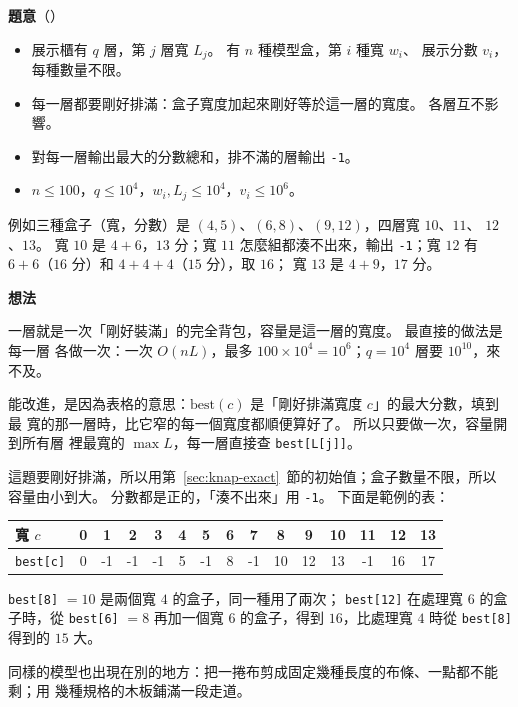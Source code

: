 \textbf{題意}（）

\begin{itemize}
\item 展示櫃有 $q$ 層，第 $j$ 層寬 $L_j$。 有 $n$ 種模型盒，第 $i$ 種寬 $w_i$、
展示分數 $v_i$，每種數量不限。
\item 每一層都要剛好排滿：盒子寬度加起來剛好等於這一層的寬度。 各層互不影響。
\item 對每一層輸出最大的分數總和，排不滿的層輸出 \texttt{-1}。
\item $n \le 100$，$q \le 10^4$，$w_i, L_j \le 10^4$，$v_i \le 10^6$。
\end{itemize}

例如三種盒子（寬，分數）是 $(4, 5)$、$(6, 8)$、$(9, 12)$，四層寬 $10$、$11$、
$12$、$13$。 寬 $10$ 是 $4 + 6$，$13$ 分；寬 $11$ 怎麼組都湊不出來，輸出
\texttt{-1}；寬 $12$ 有 $6 + 6$（$16$ 分）和 $4 + 4 + 4$（$15$ 分），取 $16$；
寬 $13$ 是 $4 + 9$，$17$ 分。

\textbf{想法}

一層就是一次「剛好裝滿」的完全背包，容量是這一層的寬度。 最直接的做法是每一層
各做一次：一次 $O(nL)$，最多 $100 \times 10^4 = 10^6$；$q = 10^4$ 層要
$10^{10}$，來不及。

能改進，是因為表格的意思：$\mathrm{best}(c)$ 是「剛好排滿寬度 $c$」的最大分數，填到最
寬的那一層時，比它窄的每一個寬度都順便算好了。 所以只要做一次，容量開到所有層
裡最寬的 $\max L$，每一層直接查 \texttt{best[L[j]]}。

這題要剛好排滿，所以用第~\ref{sec:knap-exact}~節的初始值；盒子數量不限，所以
容量由小到大。 分數都是正的，「湊不出來」用 \texttt{-1}。 下面是範例的表：

\begin{center}
\begin{tabular}{l|cccccccccccccc}
\toprule
寬 $c$ & 0 & 1 & 2 & 3 & 4 & 5 & 6 & 7 & 8 & 9 & 10 & 11 & 12 & 13 \\
\midrule
\texttt{best[c]} & 0 & -1 & -1 & -1 & 5 & -1 & 8 & -1 & 10 & 12 & 13 & -1 & 16 & 17 \\
\bottomrule
\end{tabular}
\end{center}

\texttt{best[8]} $= 10$ 是兩個寬 $4$ 的盒子，同一種用了兩次；
\texttt{best[12]} 在處理寬 $6$ 的盒子時，從 \texttt{best[6]} $= 8$ 再加一個寬
$6$ 的盒子，得到 $16$，比處理寬 $4$ 時從 \texttt{best[8]} 得到的 $15$ 大。

同樣的模型也出現在別的地方：把一捲布剪成固定幾種長度的布條、一點都不能剩；用
幾種規格的木板鋪滿一段走道。

